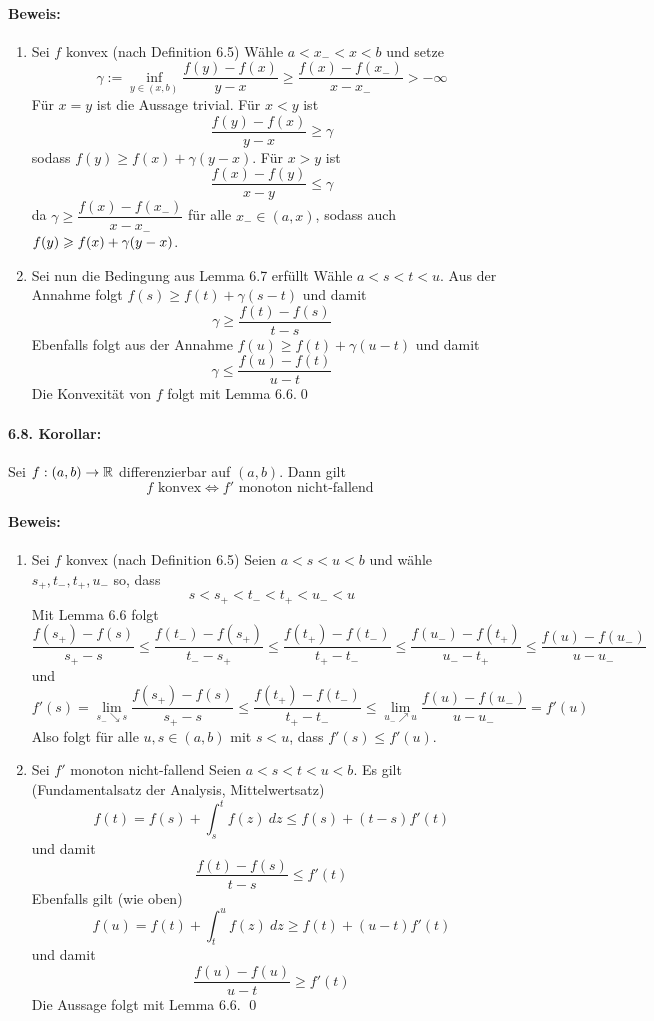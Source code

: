  \paragraph{Beweis:}
 \begin{enumerate}[label=\Roman*.]
     \item Sei $f$ konvex (nach Definition 6.5)\newline
     W\"ahle $a<x_-<x<b$ und setze
     $$\gamma:=\inf_{y\in(x,b)}\dfrac{f(y)-f(x)}{y-x}\geq\dfrac{f(x)-f(x_-)}{x-x_-}>-\infty$$
     F\"ur $x=y$ ist die Aussage trivial. F\"ur $x<y$ ist 
     $$\dfrac{f(y)-f(x)}{y-x}\geq\gamma$$
     sodass $f(y)\geq f(x)+\gamma(y-x)$. F\"ur $x>y$ ist 
     $$\dfrac{f(x)-f(y)}{x-y}\leq \gamma$$
    da $\gamma\geq \dfrac{f(x)-f(x_-)}{x-x_-}$ f\"ur alle $x_-\in(a,x)$, sodass auch $f(y) \geq\nobreak f(x)+\gamma(y-x)$.
     \item Sei nun die Bedingung aus Lemma 6.7 erf\"ullt\newline
     W\"ahle $a<s<t<u$. Aus der Annahme folgt $f(s)\geq f(t)+\gamma(s-t)$ und damit 
     $$\gamma\geq\dfrac{f(t)-f(s)}{t-s}$$
     Ebenfalls folgt aus der Annahme $f(u)\geq f(t)+\gamma(u-t)$ und damit 
     $$\gamma\leq\dfrac{f(u)-f(t)}{u-t}$$
     Die Konvexit\"at von $f$ folgt mit Lemma 6.6.\qed
 \end{enumerate}
 
 \paragraph{6.8. Korollar:}Sei $f:(a,b)\to\R$ differenzierbar auf $(a,b)$. Dann gilt
 $$f\text{ konvex}\iff f'\text{ monoton nicht-fallend}$$
 
 \paragraph{Beweis:}
 \begin{enumerate}[label=\Roman*.]
     \item Sei $f$ konvex (nach Definition 6.5)\newline
     Seien $a<s<u<b$ und w\"ahle $s_+,t_-,t_+,u_-$ so, dass
     $$s<s_+<t_-<t_+<u_-<u$$
     Mit Lemma 6.6 folgt
     $$\dfrac{f(s_+)-f(s)}{s_+-s}\leq\dfrac{f(t_-)-f(s_+)}{t_--s_+}\leq\dfrac{f(t_+)-f(t_-)}{t_+-t_-}\leq\dfrac{f(u_-)-f(t_+)}{u_--t_+}\leq\dfrac{f(u)-f(u_-)}{u-u_-}$$
     und 
     $$f'(s)=\lim_{s_-\searrow s}\dfrac{f(s_+)-f(s)}{s_+-s}\leq\dfrac{f(t_+)-f(t_-)}{t_+-t_-}\leq\lim_{u_-\nearrow u}\dfrac{f(u)-f(u_-)}{u-u_-}=f'(u)$$
     Also folgt f\"ur alle $u,s\in(a,b)$ mit $s<u$, dass $f'(s)\leq f'(u)$.
     \item Sei $f'$ monoton nicht-fallend\newline
     Seien $a<s<t<u<b$. Es gilt (Fundamentalsatz der Analysis, Mittelwertsatz)
     $$f(t)=f(s)+\int_s^t f(z)\ dz\leq f(s)+(t-s)f'(t)$$
     und damit 
     $$\dfrac{f(t)-f(s)}{t-s}\leq f'(t)$$
     Ebenfalls gilt (wie oben)
     $$f(u)=f(t)+\int_t^uf(z)\ dz\geq f(t)+(u-t)f'(t)$$
     und damit 
     $$\dfrac{f(u)-f(u)}{u-t}\geq f'(t)$$
     Die Aussage folgt mit Lemma 6.6. \qed
 \end{enumerate}
 

